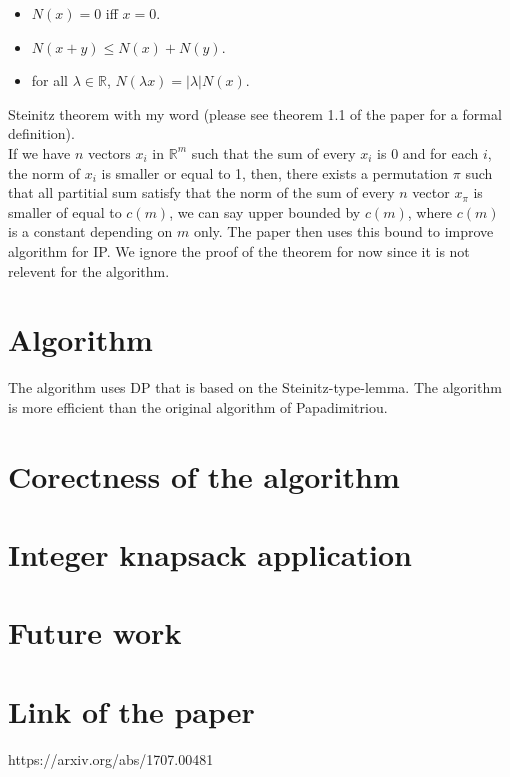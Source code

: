 \documentclass[12pt]{article}
\theoremstyle{definition}
\begin{document}
\begin{itemize}
	\item $N(x) = 0$ iff $x=0$.
	\item $N(x+y) \leq N(x) + N(y)$.
	\item for all $\lambda \in \mathbb{R}$, $N(\lambda x) = |\lambda|N(x)$.
\end{itemize} 

Steinitz theorem with my word (please see theorem 1.1 of the paper for a formal definition). \\
If we have $n$ vectors $x_i$ in $\mathbb{R}^m$ such that the sum of every $x_i$ is 0 and for each $i$, the  norm of $x_i$ is smaller or equal to 1, then, there exists a permutation $\pi$ such that all partitial sum satisfy that the norm of the sum of every $n$ vector $x_{\pi}$ is smaller of equal to $c(m)$, we can say upper bounded by $c(m)$, where $c(m)$ is a constant depending on $m$ only. The paper then uses this bound to improve algorithm for IP. We ignore the proof of the theorem for now since it is not relevent for the algorithm.

\section{Algorithm}

The algorithm uses DP that is based on the Steinitz-type-lemma. The algorithm is more efficient than the original algorithm of Papadimitriou.

\section{Corectness of the algorithm}
\section{Integer knapsack application}
\section{Future work}

\section{Link of the paper}

https://arxiv.org/abs/1707.00481
\end{document}
